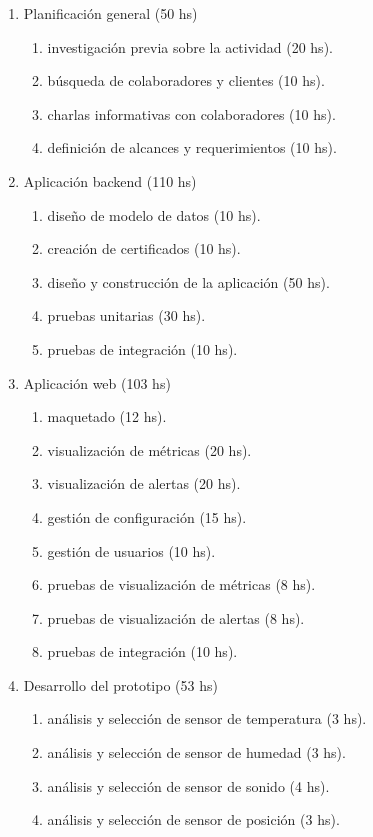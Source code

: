 \documentclass[
11pt, %
codirector, %
]{charter}
\begin{document}
\begin{enumerate}
\item Planificación general (50 hs)
	\begin{enumerate}
	\item investigación previa sobre la actividad (20 hs).
	\item búsqueda de colaboradores y clientes (10 hs).
	\item charlas informativas con colaboradores (10 hs).
	\item definición de alcances y requerimientos (10 hs).
	\end{enumerate}
\item Aplicación backend (110 hs)
	\begin{enumerate}
	\item diseño de modelo de datos (10 hs).
	\item creación de certificados (10 hs).
	\item diseño y construcción de la aplicación (50 hs).
	\item pruebas unitarias (30 hs).
	\item pruebas de integración (10 hs).
	\end{enumerate}
\item Aplicación web (103 hs)
	\begin{enumerate}
	\item maquetado (12 hs).
	\item visualización de métricas (20 hs).
	\item visualización de alertas (20 hs).
	\item gestión de configuración (15 hs).
	\item gestión de usuarios (10 hs).
	\item pruebas de visualización de métricas (8 hs).
	\item pruebas de visualización de alertas (8 hs).
	\item pruebas de integración (10 hs).
	\end{enumerate}
\item Desarrollo del prototipo (53 hs)
	\begin{enumerate}
		\item análisis y selección de sensor de temperatura (3 hs).
		\item análisis y selección de sensor de humedad (3 hs).
		\item análisis y selección de sensor de sonido (4 hs).
		\item análisis y selección de sensor de posición (3 hs).	

\end{enumerate}
\end{enumerate}
\end{document}
